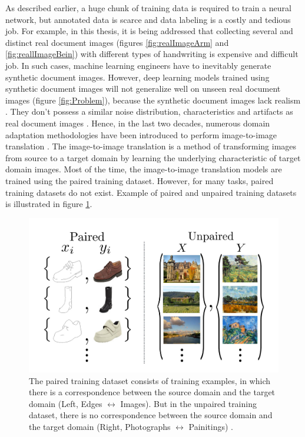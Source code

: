 As described earlier, a huge chunk of training data is required to train a neural network, but annotated data is scarce and data labeling is a costly and tedious job. For example, in this thesis, it is being addressed that collecting several and distinct real document images (figures \ref{fig:realImageArm} and \ref{fig:reallImageBein}) with different types of handwriting is expensive and difficult job. In such cases, machine learning engineers have to inevitably generate synthetic document images. However, deep learning models trained using synthetic document images will not generalize well on unseen real document images (figure \ref{fig:Problem}), because the synthetic document images lack realism  \cite{8978087}. They don't possess a similar noise distribution, characteristics and artifacts as real document images \cite{8978087}. Hence, in the last two decades, numerous domain adaptation methodologies have been introduced to perform image-to-image translation \cite{8978011}. The image-to-image translation is a method of transforming images from source to a target domain by learning the underlying characteristic of target domain images. Most of the time, the image-to-image translation models are trained using the paired training dataset. However, for many tasks, paired training datasets do not exist. Example of paired and unpaired training datasets is illustrated in figure \ref{fig:pairedUnpaired}. 


\begin{figure}[H]
        \begin{center}
	    \includegraphics[scale=0.50]{images/Introduction/pairedUnpaired.JPG}
	    \caption[Examples of the paired training dataset and the unpaired training dataset.]{The paired training dataset consists of training examples, in which there is a correspondence between the source domain and the target domain (Left, Edges $\leftrightarrow$ Images). But in the unpaired training dataset, there is no correspondence between the source domain and the target domain (Right, Photographs $\leftrightarrow$ Painitings) \cite{zhu2020unpaired}.}
	    \label{fig:pairedUnpaired}
	    \end{center}
\end{figure}


